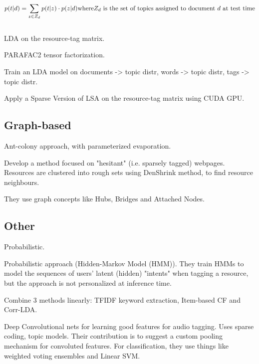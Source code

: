 $$
p(t | d ) = \sum_{z \in Z_d} p(t|z) \cdot p(z|d)

\textnormal{where} Z_d \ \textnormal{is the set of topics assigned to document} \ d \ \textnormal{at test time}
$$\\

\cite{bundschus_etal_2009} LDA on the resource-tag matrix.

\cite{panagopoulos_kotropoulos_2015} PARAFAC2 tensor factorization.

\cite{hu_etal_2012} Train an LDA model on documents -> topic distr, words -> topic distr, tags -> topic distr.

\cite{zhang_etal_2014} Apply a Sparse Version of LSA on the resource-tag matrix using CUDA GPU.


\subsection{Graph-based}

\cite{sharma_bedi_2009} Ant-colony approach, with parameterized evaporation.

\cite{wang_etal_2015} Develop a method focused on "hesitant" (i.e. sparsely tagged) webpages. Resources are clustered into rough sets using DenShrink method, to find resource neighbours.

They use graph concepts like Hubs, Bridges and Attached Nodes.

\subsection{Other}

\cite{si_sun_2010} Probabilistic.

\cite{trabelsi_etal_2012} Probabilistic approach (Hidden-Markov Model (HMM)). They train HMMs to model the sequences of users' latent (hidden) "intents" when tagging a resource, but the approach is not personalized at inference time.

\cite{liu_etal_2013} Combine 3 methods linearly: TFIDF keyword extraction, Item-based CF and Corr-LDA.



\cite{sattigeri_etal_2014}

Deep Convolutional nets for learning good features for audio tagging. Uses sparse coding, topic models.
Their contribution is to suggest a custom pooling mechanism for convoluted features.
For classification, they use things like weighted voting ensembles and Linear SVM.


